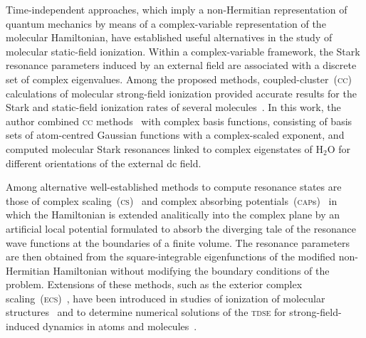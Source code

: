 
Time-independent approaches, which imply a non-Hermitian
representation of quantum mechanics by means of a complex-variable
representation of the molecular Hamiltonian, have established useful
alternatives in the study of molecular static-field ionization. Within
a complex-variable framework, the Stark resonance parameters induced
by an external field are associated with a discrete set of complex
eigenvalues. Among the proposed methods, coupled-cluster~(\textsc{cc})
calculations of molecular strong-field ionization provided accurate
results for the Stark and static-field ionization rates of several
molecules~\cite{Jagau_manybody_H2O}. In this work, the author combined
\textsc{cc} methods~\cite{cc_method} with complex basis functions,
consisting of basis sets of atom-centred Gaussian functions with a
complex-scaled exponent, and computed molecular Stark resonances
linked to complex eigenstates of H$_{2}$O for different orientations
of the external dc field.


Among alternative well-established methods to compute resonance states
are those of complex scaling~(\textsc{cs})~\cite{complexScalingSimon}
and complex absorbing potentials~(\textsc{cap}s)~\cite{RissMeyer_1993}
in which the Hamiltonian is extended analitically into the complex
plane by an artificial local potential formulated to absorb the
diverging tale of the resonance wave functions at the boundaries of a
finite volume. The resonance parameters are then obtained from the
square-integrable eigenfunctions of the modified non-Hermitian
Hamiltonian without modifying the boundary conditions of the
problem. Extensions of these methods, such as the exterior complex
scaling~(\textsc{ecs})~\cite{Simon_1979}, have been introduced in
studies of ionization of molecular
structures~\cite{ScrinziJChemPhys_ECS,ScrinziJPhysB_ECS} and to
determine numerical solutions of the \textsc{tdse} for
strong-field-induced dynamics in atoms and
molecules~\cite{Krause_2014,ecsScrinzi,ecsRuiz}.

